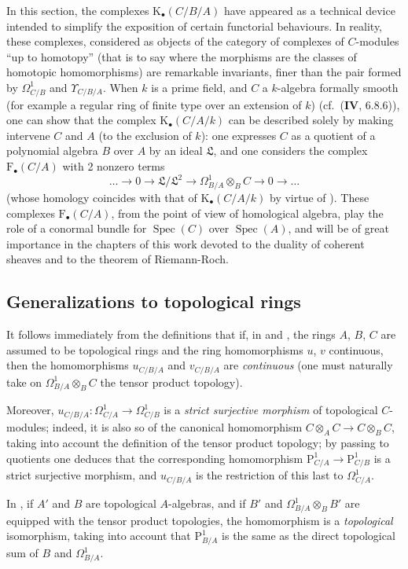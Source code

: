 \begin{remark}[20.6.26]
\label{0.20.6.26}
In this section, the complexes $\mathrm{K}_\bullet(C/B/A)$ have appeared as a technical device intended to simplify the exposition of certain functorial behaviours.
In reality, these complexes, considered as objects of the category of
complexes of $C$-modules ``up to homotopy'' (that is to say where the morphisms are the classes of homotopic homomorphisms) are remarkable invariants, finer than the pair formed by $\Omega^1_{C/B}$ and $\Upsilon_{C/B/A}$.
When $k$ is a prime field, and $C$ a $k$-algebra formally smooth (for example a regular ring of finite type over an extension of $k$) (cf.\ ($\mathbf{IV}$, 6.8.6)), one can show that the complex $\mathrm{K}_\bullet(C/A/k)$ can be described solely by making intervene $C$ and $A$ (to the exclusion of $k$): one expresses $C$ as a quotient of a polynomial algebra $B$ over $A$ by an ideal $\mathfrak{L}$, and one considers the complex $\mathrm{F}_\bullet(C/A)$ with 2 nonzero terms
\[
  \ldots\to 0\to\mathfrak{L}/\mathfrak{L}^2\to\Omega^1_{B/A}\otimes_B C\to 0\to\ldots
\]
(whose homology coincides with that of $\mathrm{K}_\bullet(C/A/k)$ by virtue of ).
These complexes $\mathrm{F}_\bullet(C/A)$, from the point of view of homological algebra, play the role of a conormal bundle for $\operatorname{Spec}(C)$ over $\operatorname{Spec}(A)$, and will be of great importance in the chapters of this work devoted to the duality of coherent sheaves and to the theorem of Riemann-Roch.
\end{remark}

\subsection{Generalizations to topological rings}
\label{subsection:0.20.7}

\begin{env}[20.7.1]
\label{0.20.7.1}
It follows immediately from the definitions that if, in  and , the rings $A$, $B$, $C$ are assumed to be topological rings and the ring homomorphisms $u$, $v$ continuous, then the homomorphisms $u_{C/B/A}$ and $v_{C/B/A}$ are \emph{continuous} (one must naturally take on $\Omega^1_{B/A}\otimes_B C$ the tensor product topology).

Moreover, $u_{C/B/A}:\Omega^1_{C/A}\to\Omega^1_{C/B}$ is a \emph{strict surjective morphism} of topological $C$-modules; indeed, it is also so of the canonical homomorphism $C\otimes_A C\to C\otimes_B C$, taking into account the definition of the tensor product topology; by passing to quotients one deduces that the corresponding homomorphism $\mathrm{P}^1_{C/A}\to\mathrm{P}^1_{C/B}$ is a strict surjective morphism, and $u_{C/B/A}$ is the restriction of this last to $\Omega^1_{C/A}$.

In , if $A'$ and $B$ are topological $A$-algebras, and if $B'$ and $\Omega^1_{B/A}\otimes_B B'$ are equipped with the tensor product topologies, the homomorphism  is a \emph{topological} isomorphism, taking into account that $\mathrm{P}^1_{B/A}$ is the same as the direct topological sum of $B$ and $\Omega^1_{B/A}$.
\end{env}

